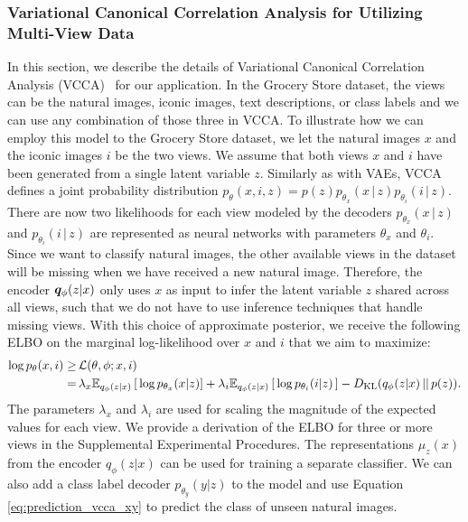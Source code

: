 \subsubsection{Variational Canonical Correlation Analysis for Utilizing Multi-View Data}
\label{paperB:sec:utilizing_additional_information}

In this section, we describe the details of Variational Canonical Correlation Analysis (VCCA)~ for our application. In the Grocery Store dataset, the views can be the natural images, iconic images, text descriptions, or class labels and we can use any combination of those three in VCCA. To illustrate how we can employ this model to the Grocery Store dataset, we let the natural images $x$ and the iconic images $i$ be the two views.  
We assume that both views $x$ and $i$ have been generated from a single latent variable $z$. Similarly as with VAEs, VCCA defines a joint probability distribution $p_{\theta}(x, i, z) = p(z)p_{\theta_{x}}(x\,|\,z)p_{\theta_{i}}(i\,|\,z)$. There are now two likelihoods for each view modeled by the decoders $p_{\theta_{x}}(x\,|\,z)$ and $p_{\theta_{i}}(i\,|\,z)$ are represented as neural networks with parameters $\theta_{x}$ and $\theta_{i}$. 
Since we want to classify natural images, the other available views in the dataset will be missing when we have received a new natural image. Therefore, the encoder ${\bm{q}}_{\phi}(z | x)$ only uses $x$ as input to infer the latent variable $z$ shared across all views, such that we do not have to use inference techniques that handle missing views. With this choice of approximate posterior, we receive the following ELBO on the marginal log-likelihood over $x$ and $i$ that we aim to maximize:
\begin{align}\label{eq:loss_vcca}
    \begin{split}
        \log p_{\theta}(x, i) \geq & \, \mathcal{L}(\theta, \phi; x, i) \\ 
        = & \,  \lambda_{x} \mathbb{E}_{q_{\phi}(z|x)}\left[\, \log p_{\theta_{x}}(x | z) \right] + \lambda_{i} \mathbb{E}_{q_{\phi}(z|x)}\left[\, \log p_{\theta_{i}}(i | z) \,\right] - D_{\mathrm{KL}}(q_{\phi}(z|x)\,||\,p(z)) .
    \end{split}
\end{align}  
The parameters $\lambda_{x}$ and $\lambda_{i}$ are used for scaling the magnitude of the expected values for each view. 
We provide a derivation of the ELBO for three or more views in the Supplemental Experimental Procedures.
The representations $\mu_{z}(x)$ from the encoder $q_{\phi}(z|x)$ can be used for training a separate classifier. We can also add a class label decoder $p_{\theta_{y}}(y | z)$ to the model and use Equation \ref{eq:prediction_vcca_xy} to predict the class of unseen natural images.


